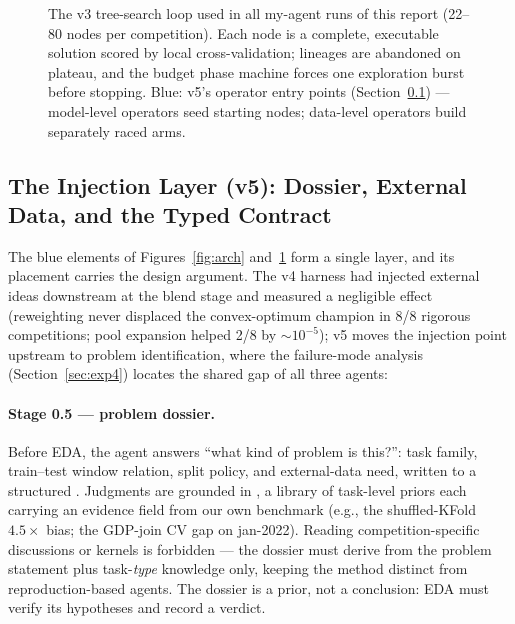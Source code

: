\documentclass[11pt,a4paper]{article}
\begin{document}
\begin{figure}[htbp]
\caption{The v3 tree-search loop used in all my-agent runs of this report (22--80 nodes per
competition). Each node is a complete, executable solution scored by local cross-validation;
lineages are abandoned on plateau, and the budget phase machine forces one exploration burst
before stopping. Blue: v5's operator entry points (Section~\ref{sec:v5}) --- model-level
operators seed starting nodes; data-level operators build separately raced arms.}
\label{fig:tree}
\end{figure}

\subsection{The Injection Layer (v5): Dossier, External Data, and the Typed Contract}
\label{sec:v5}

The blue elements of Figures~\ref{fig:arch} and~\ref{fig:tree} form a single layer, and its placement carries the design argument. The v4 harness had injected external ideas downstream at the blend stage and measured a negligible effect (reweighting never displaced the convex-optimum champion in 8/8 rigorous competitions; pool expansion helped 2/8 by ${\sim}10^{-5}$); v5 moves the injection point upstream to problem identification, where the failure-mode analysis (Section~\ref{sec:exp4}) locates the shared gap of all three agents:

\paragraph{Stage 0.5 --- problem dossier.} Before EDA, the agent answers ``what kind of problem is this?'': task family, train--test window relation, split policy, and external-data need, written to a structured . Judgments are grounded in , a library of task-level priors each carrying an evidence field from our own benchmark (e.g., the shuffled-KFold $4.5\times$ bias; the GDP-join CV gap on jan-2022). Reading competition-specific discussions or kernels is forbidden --- the dossier must derive from the problem statement plus task-\emph{type} knowledge only, keeping the method distinct from reproduction-based agents. The dossier is a prior, not a conclusion: EDA must verify its hypotheses and record a verdict.
\end{document}
